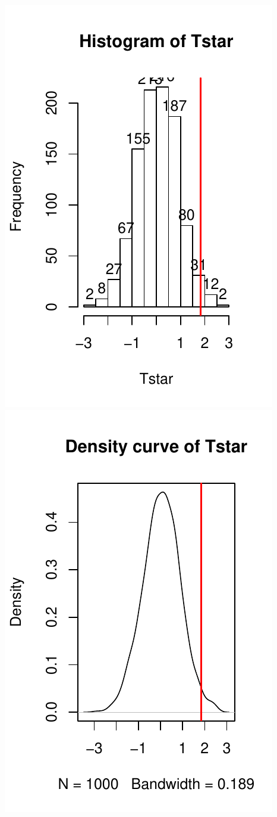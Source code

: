 \documentclass[]{book}
\begin{document}
\includegraphics{GreenwoodBanner_files/figure-latex/Figure2-10-1.pdf}
\includegraphics{GreenwoodBanner_files/figure-latex/Figure2-10-2.pdf}
\end{document}
